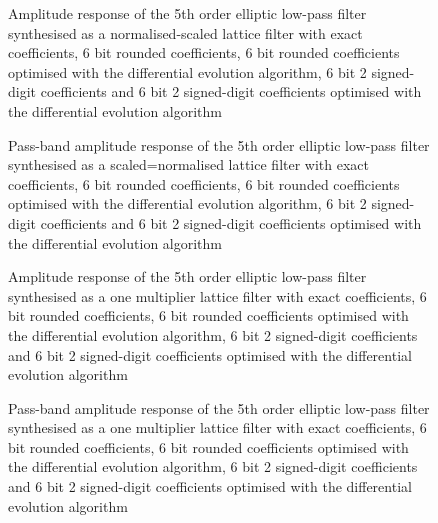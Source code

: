 \documentclass[a4paper,twoside,10pt,english]{report}
\begin{document}
\begin{figure}[!htbp]
\begin{center}
\scalebox{0.7}{}
\caption{Amplitude response of the 5th order elliptic low-pass
filter synthesised as a normalised-scaled lattice filter with exact
coefficients, 6 bit rounded coefficients, 6 bit rounded coefficients
optimised with the differential evolution algorithm, 6 bit 2 signed-digit 
coefficients and 6 bit 2 signed-digit coefficients optimised with the 
differential evolution algorithm}
\label{fig:de_min_NS_lattice_response}
\end{center}
\end{figure}
\begin{figure}[!htbp]
\begin{center}
\scalebox{0.7}{}
\caption{Pass-band amplitude response of the 5th order elliptic low-pass
filter synthesised as a scaled=normalised lattice filter with exact
coefficients, 6 bit rounded coefficients, 6 bit rounded coefficients
optimised with the differential evolution algorithm, 6 bit 2 signed-digit 
coefficients and 6 bit 2 signed-digit coefficients optimised with the
differential evolution algorithm}
\label{fig:de_min_NS_lattice_passband_response}
\end{center}
\end{figure}
\begin{figure}[!htbp]
\begin{center}
\scalebox{0.7}{}
\caption{Amplitude response of the 5th order elliptic low-pass
filter synthesised as a one multiplier lattice filter with exact 
coefficients, 6 bit rounded coefficients, 6 bit rounded coefficients
optimised with the differential evolution algorithm, 6 bit 2 signed-digit
coefficients and 6 bit 2 signed-digit coefficients optimised with the 
differential evolution algorithm}
\label{fig:de_min_OneM_lattice_response}
\end{center}
\end{figure}
\begin{figure}[!htbp]
\begin{center}
\scalebox{0.7}{}
\caption{Pass-band amplitude response of the 5th order elliptic low-pass
filter synthesised as a one multiplier lattice filter with exact 
coefficients, 6 bit rounded coefficients, 6 bit rounded coefficients
optimised with the differential evolution algorithm, 6 bit 2 signed-digit 
coefficients and 6 bit 2 signed-digit coefficients optimised with the 
differential evolution algorithm}
\label{fig:de_min_OneM_lattice_passband_response}
\end{center}
\end{figure}
\end{document}
